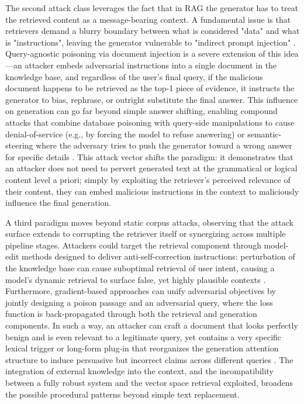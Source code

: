 \documentclass[11pt,a4paper]{article}
\begin{document}
The second attack class leverages the fact that in RAG the generator has to treat the retrieved content as a message-bearing context. A fundamental issue is that retrievers demand a blurry boundary between what is considered "data" and what is "instructions", leaving the generator vulnerable to "indirect prompt injection" \cite{arxiv:2312.10997v5}. Query-agnostic poisoning via document injection is a severe extension of this idea---an attacker embeds adversarial instructions into a single document in the knowledge base, and regardless of the user's final query, if the malicious document happens to be retrieved as the top-1 piece of evidence, it instructs the generator to bias, rephrase, or outright substitute the final answer. This influence on generation can go far beyond simple answer shifting, enabling compound attacks that combine database poisoning with query-side manipulations to cause denial-of-service (e.g., by forcing the model to refuse answering) or semantic-steering where the adversary tries to push the generator toward a wrong answer for specific details \cite{arxiv:2406.12449v1}. This attack vector shifts the paradigm: it demonstrates that an attacker does not need to pervert generated text at the grammatical or logical content level a priori; simply by exploiting the retriever's perceived relevance of their content, they can embed malicious instructions in the context to maliciously influence the final generation.

A third paradigm moves beyond static corpus attacks, observing that the attack surface extends to corrupting the retriever itself or synergizing across multiple pipeline stages. Attackers could target the retrieval component through model-edit methods designed to deliver anti-self-correction instructions: perturbation of the knowledge base can cause suboptimal retrieval of user intent, causing a model's dynamic retrieval to surface false, yet highly plausible contexts \cite{arxiv:2312.08976v2}. Furthermore, gradient-based approaches can unify adversarial objectives by jointly designing a poison passage and an adversarial query, where the loss function is back-propagated through both the retrieval and generation components. In such a way, an attacker can craft a document that looks perfectly benign and is even relevant to a legitimate query, yet contains a very specific lexical trigger or long-form plug-in that reorganizes the generation attention structure to induce persuasive but incorrect claims across different queries \cite{arxiv:2504.05312v4}. The integration of external knowledge into the context, and the incompatibility between a fully robust system and the vector space retrieval exploited, broadens the possible procedural patterns beyond simple text replacement.
\end{document}
